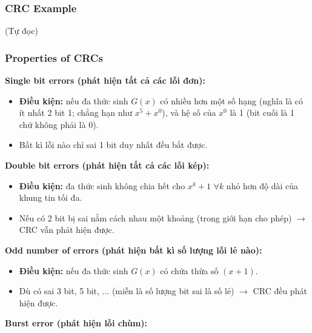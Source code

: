 \subsubsection{CRC Example}

\noindent
(Tự đọc)
\medskip

\subsubsection{Properties of CRCs}

\noindent
\textbf{Single bit errors (phát hiện tất cả các lỗi đơn):}

\begin{itemize}
    \item \textbf{Điều kiện:} nếu đa thức sinh $G(x)$ có nhiều hơn một số hạng (nghĩa là có ít nhất 2 bit 1; chẳng hạn như $x^5 + x^0$), và hệ số của $x^0$ là 1 (bit cuối là 1 chứ không phải là 0).
    \item[$\Rightarrow$] Bất kì lỗi nào chỉ sai 1 bit duy nhất đều bắt được.
\end{itemize}
\medskip

\clearpage

\noindent
\textbf{Double bit errors (phát hiện tất cả các lỗi kép):}

\begin{itemize}
    \item \textbf{Điều kiện:} đa thức sinh không chia hết cho $x^k + 1$ $\forall k$ nhỏ hơn độ dài của khung tin tối đa.
    \item[$\Rightarrow$] Nếu có 2 bit bị sai nằm cách nhau một khoảng (trong giới hạn cho phép) $\rightarrow$ CRC vẫn phát hiện được.
\end{itemize}
\medskip

\noindent
\textbf{Odd number of errors (phát hiện bất kì số lượng lỗi lẻ nào):}

\begin{itemize}
    \item \textbf{Điều kiện:} nếu đa thức sinh $G(x)$ có chứa thừa số $(x+1)$.
    \item[$\Rightarrow$] Dù có sai 3 bit, 5 bit, ... (miễn là số lượng bit sai là số lẻ) $\rightarrow$ CRC đều phát hiện được.
\end{itemize}
\medskip


\noindent
\textbf{Burst error (phát hiện lỗi chùm):}
\medskip

